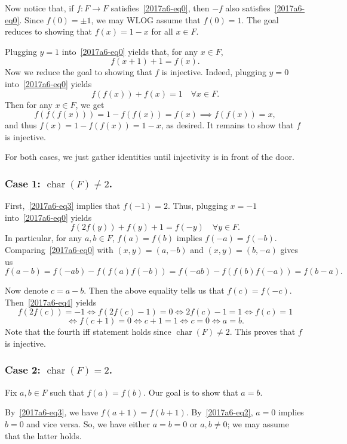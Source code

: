 \documentclass{article}
\DeclareMathOperator{\rchar}{char}
\begin{document}
Now notice that, if $f : F \to F$ satisfies~\eqref{2017a6-eq0}, then $-f$ also satisfies~\eqref{2017a6-eq0}.
Since $f(0) = \pm 1$, we may WLOG assume that $f(0) = 1$.
The goal reduces to showing that $f(x) = 1 - x$ for all $x \in F$.

Plugging $y = 1$ into~\eqref{2017a6-eq0} yields that, for any $x \in F$,
\[ f(x + 1) + 1 = f(x). \tag{3}\label{2017a6-eq3} \]
Now we reduce the goal to showing that $f$ is injective.
Indeed, plugging $y = 0$ into~\eqref{2017a6-eq0} yields
\[ f(f(x)) + f(x) = 1 \quad \forall x \in F. \]
Then for any $x \in F$, we get
\[ f(f(f(x))) = 1 - f(f(x)) = f(x) \implies f(f(x)) = x, \]
    and thus $f(x) = 1 - f(f(x)) = 1 - x$, as desired.
It remains to show that $f$ is injective.

For both cases, we just gather identities until injectivity is in front of the door.



\subsubsection*{Case 1: $\rchar(F) \neq 2$.}

First,~\eqref{2017a6-eq3} implies that $f(-1) = 2$.
Thus, plugging $x = -1$ into~\eqref{2017a6-eq0} yields
\[ f(2f(y)) + f(y) + 1 = f(-y) \quad \forall y \in F. \tag{4}\label{2017a6-eq4} \]
In particular, for any $a, b \in F$, $f(a) = f(b)$ implies $f(-a) = f(-b)$.
Comparing~\eqref{2017a6-eq0} with $(x, y) = (a, -b)$ and $(x, y) = (b, -a)$ gives us
\[ f(a - b) = f(-ab) - f(f(a) f(-b)) = f(-ab) - f(f(b) f(-a)) = f(b - a). \]

Now denote $c = a - b$.
Then the above equality tells us that $f(c) = f(-c)$.
Then~\eqref{2017a6-eq4} yields
\[ f(2f(c)) = -1 \iff f(2f(c) - 1) = 0 \iff 2f(c) - 1 = 1 \iff f(c) = 1 \]
\[ \iff f(c + 1) = 0 \iff c + 1 = 1 \iff c = 0 \iff a = b. \]
Note that the fourth iff statement holds since $\rchar(F) \neq 2$.
This proves that $f$ is injective.



\subsubsection*{Case 2: $\rchar(F) = 2$.}

Fix $a, b \in F$ such that $f(a) = f(b)$.
Our goal is to show that $a = b$.

By~\eqref{2017a6-eq3}, we have $f(a + 1) = f(b + 1)$.
By~\eqref{2017a6-eq2}, $a = 0$ implies $b = 0$ and vice versa.
So, we have either $a = b = 0$ or $a, b \neq 0$; we may assume that the latter holds.
\end{document}
